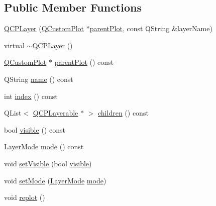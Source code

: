 \subsection*{Public Member Functions}
\begin{DoxyCompactItemize}
\item 
\hyperlink{class_q_c_p_layer_a5d0657fc86d624e5efbe930ef21af718}{Q\+C\+P\+Layer} (\hyperlink{class_q_custom_plot}{Q\+Custom\+Plot} $\ast$\hyperlink{class_q_c_p_layer_a5520019787482e13857ebe631c27c3fa}{parent\+Plot}, const Q\+String \&layer\+Name)
\item 
virtual \hyperlink{class_q_c_p_layer_afc1a8940f8e34c9f25ead9dfd4828cae}{$\sim$\+Q\+C\+P\+Layer} ()
\item 
\hyperlink{class_q_custom_plot}{Q\+Custom\+Plot} $\ast$ \hyperlink{class_q_c_p_layer_a5520019787482e13857ebe631c27c3fa}{parent\+Plot} () const
\item 
Q\+String \hyperlink{class_q_c_p_layer_a37806f662b50b588fb1029a14fc5ef50}{name} () const
\item 
int \hyperlink{class_q_c_p_layer_ad322905c4700dcc7ceba63e011c730d2}{index} () const
\item 
Q\+List$<$ \hyperlink{class_q_c_p_layerable}{Q\+C\+P\+Layerable} $\ast$ $>$ \hyperlink{class_q_c_p_layer_a183b90941fc78f0b136edd77c5fb6966}{children} () const
\item 
bool \hyperlink{class_q_c_p_layer_ad1cc2d6b32d2abb33c7f449b964e068c}{visible} () const
\item 
\hyperlink{class_q_c_p_layer_a67dcfc1590be2a1f2227c5a39bb59c7c}{Layer\+Mode} \hyperlink{class_q_c_p_layer_a44ae50b011b19f3dd46a38d8e2e2c1b6}{mode} () const
\item 
void \hyperlink{class_q_c_p_layer_ac07671f74edf6884b51a82afb2c19516}{set\+Visible} (bool \hyperlink{class_q_c_p_layer_ad1cc2d6b32d2abb33c7f449b964e068c}{visible})
\item 
void \hyperlink{class_q_c_p_layer_a938d57b04f4e4c23cedf1711f983919b}{set\+Mode} (\hyperlink{class_q_c_p_layer_a67dcfc1590be2a1f2227c5a39bb59c7c}{Layer\+Mode} \hyperlink{class_q_c_p_layer_a44ae50b011b19f3dd46a38d8e2e2c1b6}{mode})
\item 
void \hyperlink{class_q_c_p_layer_adefd53b6db02f470151c416f42e37180}{replot} ()
\end{DoxyCompactItemize}
